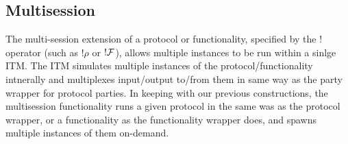 %

\subsection{Multisession}
The multi-session extension of a protocol or functionality, specified by the $!$ operator (such as $!\rho$ or $!\mathcal{F}$), allows multiple instances to be run within a sinlge ITM.
The ITM simulates multiple instances of the protocol/functionality intnerally and multiplexes input/output to/from them in same way as the party wrapper for protocol parties.
In keeping with our previous constructions, the multisession functionality runs a given protocol in the same was as the protocol wrapper, or a functionality as the functionality wrapper does, and spawns multiple instances of them on-demand.

